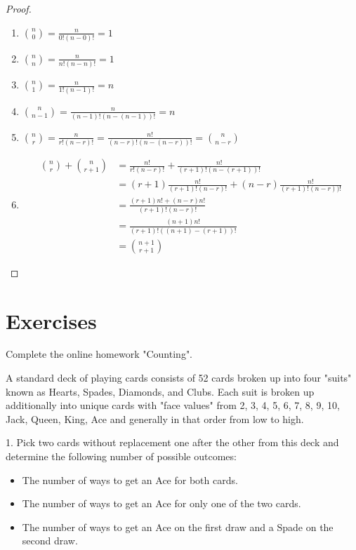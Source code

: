 \documentclass[10pt,]{book}
\theoremstyle{plain}
\theoremstyle{definition}
\theoremstyle{definition}
\theoremstyle{definition}
\numberwithin{equation}{section}
\begin{document}
\begin{proof}\hypertarget{proof-9}{}

	\leavevmode%
\begin{enumerate}
\item\hypertarget{li-80}{}\(\binom{n}{0} = \frac{n}{0!(n-0)!} = 1\)%
\item\hypertarget{li-81}{}\(\binom{n}{n} = \frac{n}{n!(n-n)!} = 1\)%
\item\hypertarget{li-82}{}\(\binom{n}{1} = \frac{n}{1!(n-1)!} = n\)%
\item\hypertarget{li-83}{}\(\binom{n}{n-1} = \frac{n}{(n-1)!(n-(n-1))!} = n\)%
\item\hypertarget{li-84}{}\(\binom{n}{r} = \frac{n}{r!(n-r)!} = \frac{n!}{(n-r)!(n-(n-r))!} = \binom{n}{n-r}\)%
\item\hypertarget{li-85}{}\begin{align*}
\binom{n}{r} + \binom{n}{r+1} & = \frac{n!}{r!(n-r)!} + \frac{n!}{(r+1)!(n-(r+1))!}\\
 & = (r+1) \frac{n!}{(r+1)!(n-r)!} + (n-r) \frac{n!}{(r+1)!(n-r))!}\\
 & = \frac{(r+1) n! + (n-r)n!}{(r+1)!(n-r)!}\\
 & = \frac{(n+1) n!}{(r+1)!((n+1)-(r+1))!}\\
 & = \binom{n+1}{r+1}
\end{align*}%
\end{enumerate}

\end{proof}
\typeout{************************************************}
\typeout{************************************************}
\section[{Exercises}]{Exercises}\label{section-16}
Complete the online homework "Counting".%
\par

A standard deck of playing cards consists of 52 cards broken up into four "suits" known as Hearts, Spades, Diamonds, and Clubs. Each suit is broken up additionally into unique cards with "face values" from {2, 3, 4, 5, 6, 7, 8, 9, 10, Jack, Queen, King, Ace} and generally in that order from low to high.%
\par

1.  Pick two cards without replacement one after the other from this deck and determine the following number of possible outcomes:
\leavevmode%
\begin{itemize}[label=\textbullet]
\item{}The number of ways to get an Ace for both cards.%
\item{}The number of ways to get an Ace for only one of the two cards.%
\item{}The number of ways to get an Ace on the first draw and a Spade on the second draw.%
\end{itemize}
\end{document}
